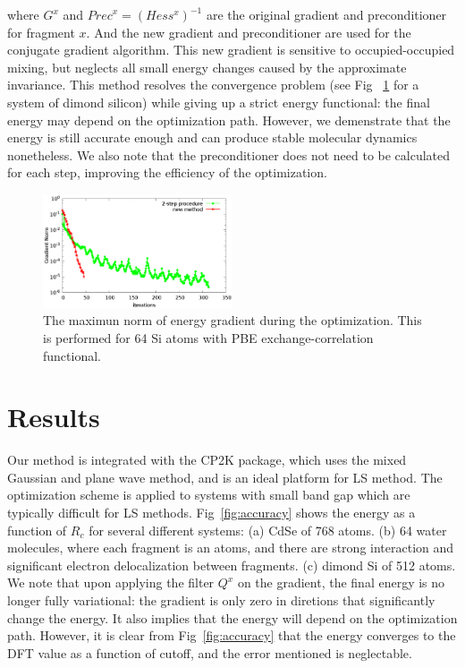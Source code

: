 \documentclass[prl,twocolumn,showpacs]{revtex4}
\begin{document}
where $G^x$ and ${Prec}^x = (Hess^x)^{-1}$ are the original gradient and preconditioner for fragment $x$. And the new gradient and preconditioner are used for the conjugate gradient algorithm. This new gradient is sensitive to occupied-occupied mixing, but neglects all small energy changes caused by the approximate invariance. This method resolves the convergence problem (see Fig ~\ref{fig:convergence} for a system of dimond silicon) while giving up a strict energy functional: the final energy may depend on the optimization path. However, we demenstrate that the energy is still accurate enough and can produce stable molecular dynamics nonetheless.
We also note that the preconditioner does not need to be calculated for each step, improving the efficiency of the optimization. 

\begin{figure}
\includegraphics[width=0.5\textwidth]{convergence}
\caption{The maximun norm of energy gradient during the optimization. This is performed for 64 Si atoms with PBE exchange-correlation functional.}
\label{fig:convergence}
\end{figure}
\section{Results}

Our method is integrated with the CP2K package\cite{cp2kgeneral}, which uses the mixed Gaussian and plane wave method\cite{vandevondele2005quickstep}, and is an ideal platform for LS method. The optimization scheme is applied to systems with small band gap which are typically difficult for LS methods. Fig~\ref{fig:accuracy} shows the energy as a function of $R_c$ for several different systems: (a) CdSe of 768 atoms. (b) 64 water molecules, where each fragment is an atoms, and there are strong interaction and significant electron delocalization between fragments. (c) dimond Si of 512 atoms. We note that upon applying the filter $Q^x$ on the gradient, the final energy is no longer fully variational: the gradient is only zero in diretions that significantly change the energy. It also implies that the energy will depend on the optimization path. However, it is clear from Fig~\ref{fig:accuracy} that the energy converges to the DFT value as a function of cutoff, and the error mentioned is neglectable. 
\end{document}
